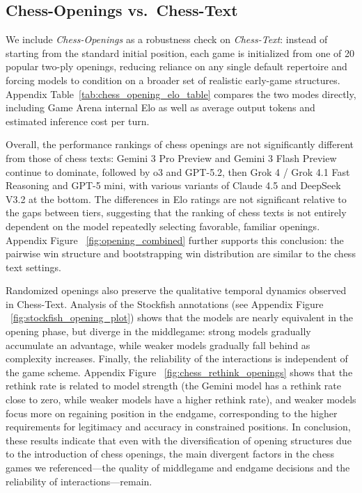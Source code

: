 \documentclass{article}
\begin{document}
\subsection{Chess-Openings vs.\ Chess-Text}
\label{sec:appendix_chess_openings_vs_text}

We include \emph{Chess-Openings} as a robustness check on \emph{Chess-Text}: instead of starting from the standard initial position, each game is initialized from one of 20 popular two-ply openings, reducing reliance on any single default repertoire and forcing models to condition on a broader set of realistic early-game structures. Appendix Table~\ref{tab:chess_opening_elo_table} compares the two modes directly, including Game Arena internal Elo as well as average output tokens and estimated inference cost per turn.

Overall, the performance rankings of chess openings are not significantly different from those of chess texts: Gemini 3 Pro Preview and Gemini 3 Flash Preview continue to dominate, followed by o3 and GPT-5.2, then Grok 4 / Grok 4.1 Fast Reasoning and GPT-5 mini, with various variants of Claude 4.5 and DeepSeek V3.2 at the bottom. The differences in Elo ratings are not significant relative to the gaps between tiers, suggesting that the ranking of chess texts is not entirely dependent on the model repeatedly selecting favorable, familiar openings. Appendix Figure ~\ref{fig:opening_combined} further supports this conclusion: the pairwise win structure and bootstrapping win distribution are similar to the chess text settings.


Randomized openings also preserve the qualitative temporal dynamics observed in Chess-Text. Analysis of the Stockfish annotations (see Appendix Figure ~\ref{fig:stockfish_opening_plot}) shows that the models are nearly equivalent in the opening phase, but diverge in the middlegame: strong models gradually accumulate an advantage, while weaker models gradually fall behind as complexity increases. Finally, the reliability of the interactions is independent of the game scheme. Appendix Figure ~\ref{fig:chess_rethink_openings} shows that the rethink rate is related to model strength (the Gemini model has a rethink rate close to zero, while weaker models have a higher rethink rate), and weaker models focus more on regaining position in the endgame, corresponding to the higher requirements for legitimacy and accuracy in constrained positions. In conclusion, these results indicate that even with the diversification of opening structures due to the introduction of chess openings, the main divergent factors in the chess games we referenced—the quality of middlegame and endgame decisions and the reliability of interactions—remain.
\end{document}
